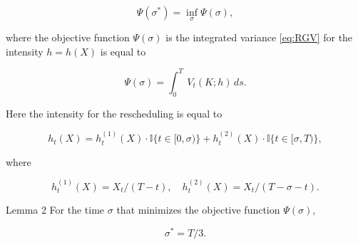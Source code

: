 
\begin{equation}\label{eq:PsiSigma}

 \Psi ({\sigma}^*) = \inf_{\sigma}\Psi (\sigma),

\end{equation}

where the objective function $\Psi (\sigma)$ is the integrated variance \eqref{eq:RGV} for the intensity $h = h(X)$ is equal to

\begin{equation}\label{eq:PsiInt}

 \Psi (\sigma) =  \int_{0}^{T}\!\ {V_t}(K; h)\,ds.

\end{equation}

Here the intensity for the rescheduling is equal to

\begin{equation}\label{eq:hoftandX}

	{h_t}(X) = {h_t^{(1)}}(X) \cdot \mathbb{I}\{t \in [0, \sigma)\} + {h_t^{(2)}}(X) \cdot \mathbb{I}\{t \in [\sigma, T)\},

\end{equation}

where

\begin{equation}\label{eq:h1h2oftandX}

	{h_t^{(1)}}(X) = X_t / (T - t),\quad {h_t^{(2)}}(X) = X_t / (T - \sigma - t).

\end{equation}



\smallskip






\hypertarget{b:l2}{}

\begin{newthm}{Lemma 2} For the time $\sigma$ that minimizes the objective function $\Psi (\sigma),$

\begin{equation}\label{eq:lemma2}

{\sigma}^* = T / 3.

\end{equation}

\end{newthm}



